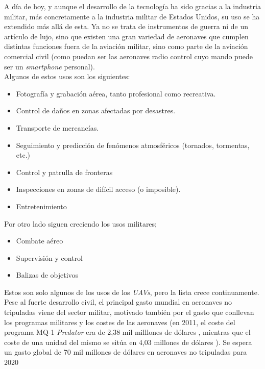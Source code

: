 A día de hoy, y aunque el desarrollo de la tecnología ha sido gracias a la industria militar, más concretamente a la industria militar de Estados Unidos, su uso se ha extendido más allá de esta. Ya no se trata de instrumentos de guerra ni de un artículo de lujo, sino que existen una gran variedad de aeronaves que cumplen distintas funciones fuera de la aviación militar, sino como parte de la aviación comercial civil (como puedan ser las aeronaves radio control cuyo mando puede ser un \emph{smartphone} personal).\\

Algunos de estos usos son los siguientes:

\begin{itemize}
	\item Fotografía y grabación aérea, tanto profesional como recreativa.
	\item Control de daños en zonas afectadas por desastres.
	\item Transporte de mercancías.
	\item Seguimiento y predicción de fenómenos atmosféricos (tornados, tormentas, etc.)
	\item Control y patrulla de fronteras
	\item Inspecciones en zonas de difícil acceso (o imposible).
	\item Entretenimiento
\end{itemize}

Por otro lado siguen creciendo los usos militares;

\begin{itemize}
	\item Combate aéreo
	\item Supervisión y control
	\item Balizas de objetivos
\end{itemize}

Estos son solo algunos de los usos de los \emph{UAVs}, pero la lista crece continuamente.\\

Pese al fuerte desarrollo civil, el principal gasto mundial en aeronaves no tripuladas viene del sector militar, motivado también por el gasto que conllevan los programas militares y los costes de las aeronaves (en 2011, el coste del programa MQ-1 \emph{Predator} era de 2,38 mil milllones de dólares \cite{Predatorunitbudget}, mientras que el coste de una unidad del mismo se sitúa en 4,03 millones de dólares \cite{Predatorprogrambudget}). Se espera un gasto global de 70 mil millones de dólares en aeronaves no tripuladas para 2020 \cite{Goldman}\\

